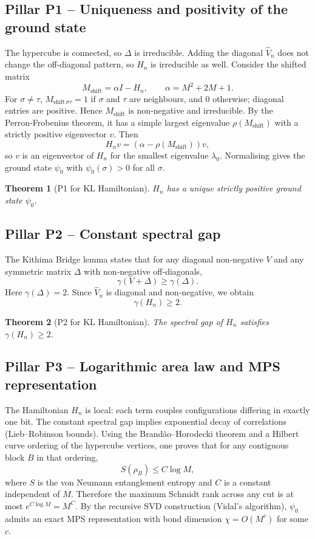\documentclass[11pt,a4paper]{article}
\newtheorem{theorem}{Theorem}[section]
\begin{document}
\subsection{Pillar P1 – Uniqueness and positivity of the ground state}

The hypercube is connected, so \(\Delta\) is irreducible. Adding the diagonal \(\hat{V}_n\) does not change the off‑diagonal pattern, so \(H_n\) is irreducible as well. Consider the shifted matrix
\[
M_{\text{shift}} = \alpha I - H_n,\qquad \alpha = M^2 + 2M + 1.
\]
For \(\sigma\neq\tau\), \(M_{\text{shift}\,\sigma\tau} = 1\) if \(\sigma\) and \(\tau\) are neighbours, and \(0\) otherwise; diagonal entries are positive. Hence \(M_{\text{shift}}\) is non‑negative and irreducible. By the Perron‑Frobenius theorem, it has a simple largest eigenvalue \(\rho(M_{\text{shift}})\) with a strictly positive eigenvector \(v\). Then
\[
H_n v = (\alpha - \rho(M_{\text{shift}})) v,
\]
so \(v\) is an eigenvector of \(H_n\) for the smallest eigenvalue \(\lambda_0\). Normalising gives the ground state \(\psi_0\) with \(\psi_0(\sigma) > 0\) for all \(\sigma\).

\begin{theorem}[P1 for KL Hamiltonian]
\(H_n\) has a unique strictly positive ground state \(\psi_0\).
\end{theorem}

\subsection{Pillar P2 – Constant spectral gap}

The Kithima Bridge lemma states that for any diagonal non‑negative \(V\) and any symmetric matrix \(\Delta\) with non‑negative off‑diagonals,
\[
\gamma(V + \Delta) \ge \gamma(\Delta).
\]
Here \(\gamma(\Delta) = 2\). Since \(\hat{V}_n\) is diagonal and non‑negative, we obtain
\[
\gamma(H_n) \ge 2.
\]

\begin{theorem}[P2 for KL Hamiltonian]
The spectral gap of \(H_n\) satisfies \(\gamma(H_n) \ge 2\).
\end{theorem}

\subsection{Pillar P3 – Logarithmic area law and MPS representation}

The Hamiltonian \(H_n\) is local: each term couples configurations differing in exactly one bit. The constant spectral gap implies exponential decay of correlations (Lieb–Robinson bounds). Using the Brandão–Horodecki theorem and a Hilbert curve ordering of the hypercube vertices, one proves that for any contiguous block \(B\) in that ordering,
\[
S(\rho_B) \le C \log M,
\]
where \(S\) is the von Neumann entanglement entropy and \(C\) is a constant independent of \(M\). Therefore the maximum Schmidt rank across any cut is at most \(e^{C\log M} = M^{C}\). By the recursive SVD construction (Vidal's algorithm), \(\psi_0\) admits an exact MPS representation with bond dimension \(\chi = O(M^{c})\) for some \(c\).
\end{document}
